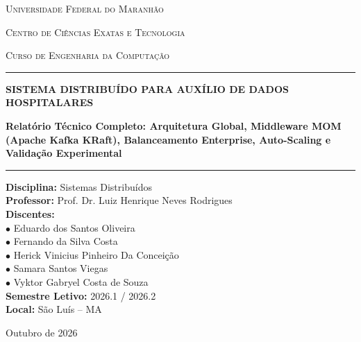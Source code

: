\documentclass[12pt,a4paper]{article}
\begin{document}
\begin{titlepage}
	\centering
	\vspace*{0.5cm}
	
	{\scshape\Large Universidade Federal do Maranhão \par}
	\vspace{0.2cm}
	{\scshape\large Centro de Ciências Exatas e Tecnologia \par}
	\vspace{0.2cm}
	{\scshape\large Curso de Engenharia da Computação \par}
	\vspace{1.2cm}
	
	\rule{\linewidth}{1.5pt}\vspace{0.4cm}
	{\huge\bfseries SISTEMA DISTRIBUÍDO PARA AUXÍLIO DE DADOS HOSPITALARES\par}
	\vspace{0.4cm}
	{\Large\bfseries Relatório Técnico Completo: Arquitetura Global, Middleware MOM (Apache Kafka KRaft), Balanceamento Enterprise, Auto-Scaling e Validação Experimental\par}
	\rule{\linewidth}{1.5pt}
	
	\vspace{1.5cm}
	
	\begin{minipage}{0.9\textwidth}
		\raggedright
		\textbf{Disciplina:} Sistemas Distribuídos \\[5pt]
		\textbf{Professor:} Prof. Dr. Luiz Henrique Neves Rodrigues \\[5pt]
		\textbf{Discentes:} \\
		\quad $\bullet$ Eduardo dos Santos Oliveira \\
		\quad $\bullet$ Fernando da Silva Costa \\
		\quad $\bullet$ Herick Vinicius Pinheiro Da Conceição \\
		\quad $\bullet$ Samara Santos Viegas \\
		\quad $\bullet$ Vyktor Gabryel Costa de Souza \\[5pt]
		\textbf{Semestre Letivo:} 2026.1 / 2026.2 \\[5pt]
		\textbf{Local:} São Luís -- MA
	\end{minipage}
	
	\vfill
	{\large Outubro de 2026\par}
\end{titlepage}
\end{document}
